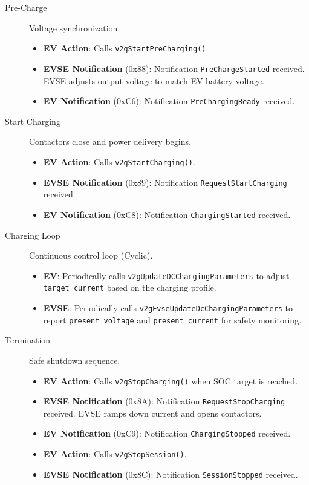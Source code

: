 \documentclass[a4paper,11pt]{report}
\begin{document}
\begin{description}
    \item[Pre-Charge] Voltage synchronization.
    \begin{itemize}
        \item \textbf{EV Action}: Calls \texttt{v2gStartPreCharging()}.
        \item \textbf{EVSE Notification} (0x88): Notification \texttt{PreChargeStarted} received. EVSE adjusts output voltage to match EV battery voltage.
        \item \textbf{EV Notification} (0xC6): Notification \texttt{PreChargingReady} received.
    \end{itemize}

    \item[Start Charging] Contactors close and power delivery begins.
    \begin{itemize}
        \item \textbf{EV Action}: Calls \texttt{v2gStartCharging()}.
        \item \textbf{EVSE Notification} (0x89): Notification \texttt{RequestStartCharging} received.
        \item \textbf{EV Notification} (0xC8): Notification \texttt{ChargingStarted} received.
    \end{itemize}

    \item[Charging Loop] Continuous control loop (Cyclic).
    \begin{itemize}
        \item \textbf{EV}: Periodically calls \texttt{v2gUpdateDCChargingParameters} to adjust \texttt{target\_current} based on the charging profile.
        \item \textbf{EVSE}: Periodically calls \texttt{v2gEvseUpdateDcChargingParameters} to report \texttt{present\_voltage} and \texttt{present\_current} for safety monitoring.
    \end{itemize}

    \item[Termination] Safe shutdown sequence.
    \begin{itemize}
        \item \textbf{EV Action}: Calls \texttt{v2gStopCharging()} when SOC target is reached.
        \item \textbf{EVSE Notification} (0x8A): Notification \texttt{RequestStopCharging} received. EVSE ramps down current and opens contactors.
        \item \textbf{EV Notification} (0xC9): Notification \texttt{ChargingStopped} received.
        \item \textbf{EV Action}: Calls \texttt{v2gStopSession()}.
        \item \textbf{EVSE Notification} (0x8C): Notification \texttt{SessionStopped} received.
    \end{itemize}
\end{description}
\end{document}
